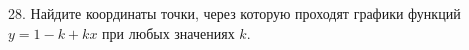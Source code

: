 28. Найдите координаты точки, через которую проходят графики функций $y=1-k+kx$ при любых значениях $k.$\\
